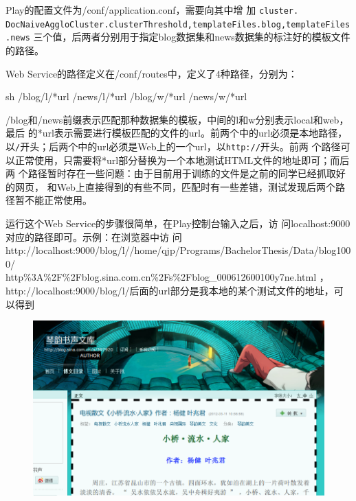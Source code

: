 \documentclass{article}
\begin{document}
Play的配置文件为\prj/conf/application.conf，需要向其中增
加
\texttt{cluster.\\DocNaiveAggloCluster.clusterThreshold,templateFiles.blog,templateFiles.news}
三个值，后两者分别用于指定blog数据集和news数据集的标注好的模板文件的路径。

Web Service的路径定义在\prj/conf/routes中，定义了4种路径，分别为：\\
\begin{code}{sh}
/blog/l/*url
/news/l/*url
/blog/w/*url
/news/w/*url  
\end{code}
/blog和/news前缀表示匹配那种数据集的模板，中间的l和w分别表示local和web，最后
的*url表示需要进行模板匹配的文件的url。前两个中的url必须是本地路径，
以\texttt{/}开头；后两个中的url必须是Web上的一个url，以\texttt{http://}开头。前两
个路径可以正常使用，只需要将*url部分替换为一个本地测试HTML文件的地址即可；而后两
个路径暂时存在一些问题：由于目前用于训练的文件是之前的同学已经抓取好的网页，
和Web上直接得到的有些不同，匹配时有一些差错，测试发现后两个路径暂不能正常使用。

运行这个Web Service的步骤很简单，在Play控制台输入之后，访
问localhost:9000对应的路径即可。示例：在浏览器中访
问
http://localhost:9000/blog/l//home/qjp/Programs/BachelorThesis/Data/blog1000/\\http\%3A\%2F\%2Fblog.sina.com.cn\%2Fs\%2Fblog\_000612600100y7ne.html
，http://localhost:9000/blog/l/后面的url部分是我本地的某个测试文件的地址，可以得到\\
\begin{figure}[h]
  \centering
  \includegraphics[width=0.8\linewidth]{demo}
\end{figure}
\end{document}
